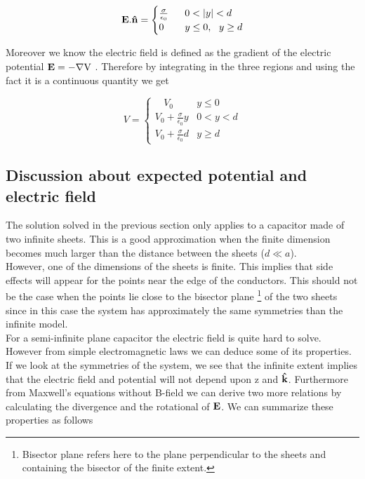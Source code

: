 \documentclass[10 pt]{article}
\numberwithin{equation}{section}
\begin{document}
\begin{multicols}{2}
\begin{equation}
\bf E . \hat n \rm = 
\begin{cases}
\frac{\sigma}{\epsilon_0} \ \ & 0 < |y| < d\\
 0 &y \leq 0 ,\ \ y \geq d
\end{cases}
\end{equation}

Moreover we know the electric field is defined as the gradient of the electric potential $\bf E\rm =- \bf \nabla \rm V$ \cite{Electro15}. Therefore by integrating in the three regions and using the fact it is a continuous quantity we get

\begin{equation}
V = 
\begin{cases}
\ \ \ \ V_0 &y \leq 0\\
V_0 + \frac{\sigma}{\epsilon_0}y  & 0 < y < d\\
V_0 + \frac{\sigma}{\epsilon_0}d &y \geq d
\end{cases}
\end{equation}

\subsection{Discussion about expected potential and electric field}

The solution solved in the previous section only applies to a capacitor made of two infinite sheets. This is a good approximation when the finite dimension becomes much larger than the distance between the sheets ($d \ll a$).\\
However, one of the dimensions of the sheets is finite. This implies that side effects will appear for the points near the edge of the conductors. This should not be the case when the points lie close to the bisector plane \footnote{Bisector plane refers here to the plane perpendicular to the sheets and containing the bisector of the finite extent.} of the two sheets since in this case the system has approximately the same symmetries than the infinite model.\\
For a semi-infinite plane capacitor the electric field is quite hard to solve. However from simple electromagnetic laws we can deduce some of its properties. If we look at the symmetries of the system, we see that the infinite extent implies that the electric field and potential will not depend upon z and $\bf \hat k$. 
Furthermore from Maxwell's equations \cite{Maxou} without B-field we can derive two more relations by calculating the divergence and the rotational of $\bf E$. We can summarize these properties as follows


\end{multicols}
\end{document}
